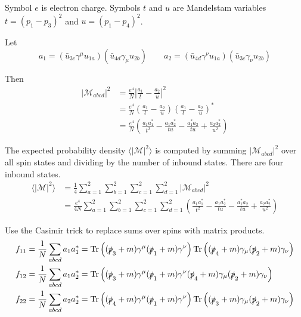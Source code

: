 \documentclass[12pt]{article}
\begin{document}
\noindent
Symbol $e$ is electron charge.
Symbols $t$ and $u$ are Mandelstam variables $t=(p_1-p_3)^2$ and $u=(p_1-p_4)^2$.

\bigskip
\noindent
Let
\begin{equation*}
a_1=(\bar{u}_{3c}\gamma^\mu u_{1a})(\bar{u}_{4d}\gamma_\mu u_{2b})
\qquad
a_2=(\bar{u}_{4d}\gamma^\nu u_{1a})(\bar{u}_{3c}\gamma_\nu u_{2b})
\end{equation*}

\noindent
Then
\begin{align*}
|\mathcal{M}_{abcd}|^2
&=
\frac{e^4}{N}
\left|\frac{a_1}{t} - \frac{a_2}{u}\right|^2\\
&=
\frac{e^4}{N}
\left(\frac{a_1}{t} - \frac{a_2}{u}\right)\left(\frac{a_1}{t} - \frac{a_2}{u}\right)^*\\
&=
\frac{e^4}{N}
\left(
\frac{a_1a_1^*}{t^2} - \frac{a_1a_2^*}{tu} -
\frac{a_1^*a_2}{tu} + \frac{a_2a_2^*}{u^2}
\right)
\end{align*}

\noindent
The expected probability density $\langle|\mathcal{M}|^2\rangle$ is computed by
summing $|\mathcal{M}_{abcd}|^2$ over all spin states and dividing by the number
of inbound states.
There are four inbound states.
\begin{align*}
\langle|\mathcal{M}|^2\rangle
&=
\frac{1}{4}\sum_{a=1}^2\sum_{b=1}^2\sum_{c=1}^2\sum_{d=1}^2
|\mathcal{M}_{abcd}|^2\\
&=
\frac{e^4}{4N}\sum_{a=1}^2\sum_{b=1}^2\sum_{c=1}^2\sum_{d=1}^2
\left(
\frac{a_1a_1^*}{t^2}-\frac{a_1a_2^*}{tu}-\frac{a_1^*a_2}{tu}+\frac{a_2a_2^*}{u^2}
\right)
\end{align*}

\noindent
Use the Casimir trick to replace sums over spins with matrix products.
\begin{align*}
f_{11}&=\frac{1}{N}\sum_{abcd}a_1a_1^*=
\mathop{\rm Tr}\left(
(\slashed{p}_3+m)\gamma^\mu(\slashed{p}_1+m)\gamma^\nu
\right)
\mathop{\rm Tr}\left(
(\slashed{p}_4+m)\gamma_\mu(\slashed{p}_2+m)\gamma_\nu
\right)
\\
f_{12}&=\frac{1}{N}\sum_{abcd}a_1a_2^*=
\mathop{\rm Tr}\left(
(\slashed{p}_3+m)\gamma^\mu(\slashed{p}_1+m)\gamma^\nu
(\slashed{p}_4+m)\gamma_\mu(\slashed{p}_2+m)\gamma_\nu
\right)
\\
f_{22}&=\frac{1}{N}\sum_{abcd}a_2a_2^*=
\mathop{\rm Tr}\left(
(\slashed{p}_4+m)\gamma^\mu(\slashed{p}_1+m)\gamma^\nu
\right)
\mathop{\rm Tr}\left(
(\slashed{p}_3+m)\gamma_\mu(\slashed{p}_2+m)\gamma_\nu
\right)
\end{align*}
\end{document}
